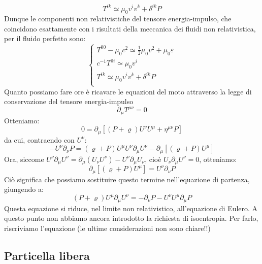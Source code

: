 \documentclass[a4paper,11pt]{book}
\theoremstyle{plain}
\theoremstyle{definition}
\begin{document}
\[
T^{ik} \simeq \mu_0v^{i}v^{k}+\delta^{ik}P
\]
Dunque le componenti non relativistiche del tensore energia-impulso, che coincidono esattamente con i risultati della meccanica dei fluidi non relativistica, per il fluido perfetto sono:
\begin{equation}
\begin{cases}
T^{00} - \mu_0c^2 \simeq \frac{1}{2}\mu_0v^2+\mu_0\varepsilon \\
c^{-1}T^{0i} \simeq \mu_0v^i \\
T^{ik} \simeq \mu_0v^{i}v^{k}+\delta^{ik}P \\
\end{cases}
\end{equation}
Quanto possiamo fare ore è ricavare le equazioni del moto attraverso la legge di conservazione del tensore energia-impulso
\[
\partial_{\mu}T^{\mu\nu}=0
\]
Otteniamo:
\[
0 = \partial_{\mu}\left[ (P+\varrho)U^{\nu}U^{\mu}+\eta^{\mu\nu}P \right]
\]
da cui, contraendo con $U^{\nu}$:
\[
-U^{\nu}\partial_{\nu}P = (\varrho+P)U^{\mu}U^{\nu}\partial_{\mu}U^{\nu}-\partial_{\mu}[ (\varrho+P)U^{\mu}]
\]
Ora, siccome $U^{\nu}\partial_{\mu}U^{\nu} = \partial_{\mu}(U_{\nu}U^{\nu})-U^{\nu}\partial_{\mu}U_{\nu}$, cioè $U_{\nu}\partial_{\mu}U^{\nu}=0$, otteniamo:
\[
\partial_{\mu}[(\varrho+P)U^{\mu}] = U^{\nu}\partial_{\nu}P
\]
Ciò significa che possiamo sostituire questo termine nell'equazione di partenza, giungendo a:
\begin{equation}
(P+\varrho)U^{\mu}\partial_{\mu}U^{\nu} = -\partial_{\nu}P-U^{\nu}U^{\mu}\partial_{\mu}P
\end{equation}
Questa equazione si riduce, nel limite non relativistico, all'equazione di Eulero. A questo punto non abbiamo ancora introdotto la richiesta di isoentropia. Per farlo, riscriviamo l'equazione (le ultime considerazioni non sono chiare!!) 

\subsection{Particella libera}
\end{document}
